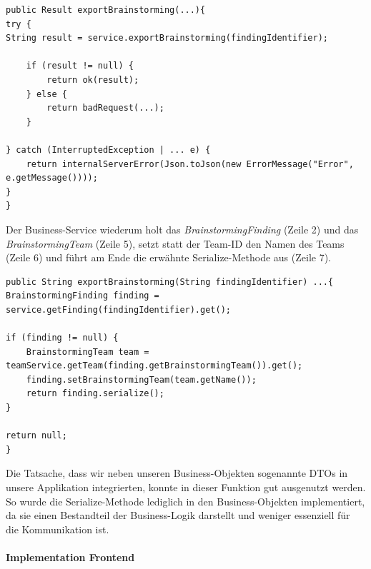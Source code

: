 \begin{lstlisting}[caption={Export-Methode im FindingController}, label=markdownFindingController]
public Result exportBrainstorming(...){
try {
String result = service.exportBrainstorming(findingIdentifier);

    if (result != null) {
        return ok(result);
    } else {
        return badRequest(...);
    }
    
} catch (InterruptedException | ... e) {
    return internalServerError(Json.toJson(new ErrorMessage("Error", e.getMessage())));
}
}
\end{lstlisting}

Der Business-Service wiederum holt das \textit{BrainstormingFinding} (Zeile 2) und das \textit{BrainstormingTeam} (Zeile 5), setzt statt der Team-ID den Namen des Teams (Zeile 6) und führt am Ende die erwähnte Serialize-Methode aus (Zeile 7). 

\begin{lstlisting}[caption={Export-Methode im FindingService}, label=markdownFindingService]
public String exportBrainstorming(String findingIdentifier) ...{
BrainstormingFinding finding = service.getFinding(findingIdentifier).get();

if (finding != null) {
    BrainstormingTeam team = teamService.getTeam(finding.getBrainstormingTeam()).get();
    finding.setBrainstormingTeam(team.getName());
    return finding.serialize();
}

return null;
}
\end{lstlisting}

Die Tatsache, dass wir neben unseren Business-Objekten sogenannte DTOs in unsere Applikation integrierten, konnte in dieser Funktion gut ausgenutzt werden. So wurde die Serialize-Methode lediglich in den Business-Objekten implementiert, da sie einen Bestandteil der Business-Logik darstellt und weniger essenziell für die Kommunikation ist.

\paragraph*{Implementation Frontend}~\\

